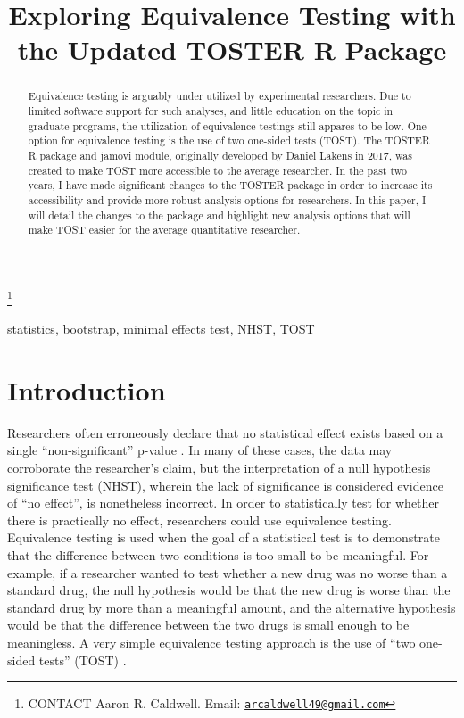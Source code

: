 \documentclass[]{interact}
\theoremstyle{plain}%
\theoremstyle{definition}
\theoremstyle{remark}
\begin{document}

\title{Exploring Equivalence Testing with the Updated TOSTER R Package}


\author{
}

\thanks{CONTACT Aaron R.
Caldwell. Email: \href{mailto:arcaldwell49@gmail.com}{\nolinkurl{arcaldwell49@gmail.com}}}

\maketitle

\begin{abstract}
Equivalence testing is arguably under utilized by experimental
researchers. Due to limited software support for such analyses, and
little education on the topic in graduate programs, the utilization of
equivalence testings still appares to be low. One option for equivalence
testing is the use of two one-sided tests (TOST). The TOSTER R package
and jamovi module, originally developed by Daniel Lakens in 2017, was
created to make TOST more accessible to the average researcher. In the
past two years, I have made significant changes to the TOSTER package in
order to increase its accessibility and provide more robust analysis
options for researchers. In this paper, I will detail the changes to the
package and highlight new analysis options that will make TOST easier
for the average quantitative researcher.
\end{abstract}

\begin{keywords}
statistics, bootstrap, minimal effects test, NHST, TOST
\end{keywords}

\hypertarget{introduction}{%
\section{Introduction}\label{introduction}}

Researchers often erroneously declare that no statistical effect exists
based on a single ``non-significant'' p-value \citep{blandaltman95}. In
many of these cases, the data may corroborate the researcher's claim,
but the interpretation of a null hypothesis significance test (NHST),
wherein the lack of significance is considered evidence of ``no
effect'', is nonetheless incorrect. In order to statistically test for
whether there is practically no effect, researchers could use
equivalence testing. Equivalence testing is used when the goal of a
statistical test is to demonstrate that the difference between two
conditions is too small to be meaningful. For example, if a researcher
wanted to test whether a new drug was no worse than a standard drug, the
null hypothesis would be that the new drug is worse than the standard
drug by more than a meaningful amount, and the alternative hypothesis
would be that the difference between the two drugs is small enough to be
meaningless. A very simple equivalence testing approach is the use of
``two one-sided tests'' (TOST) \citep{schuirmann1987}.
\end{document}
